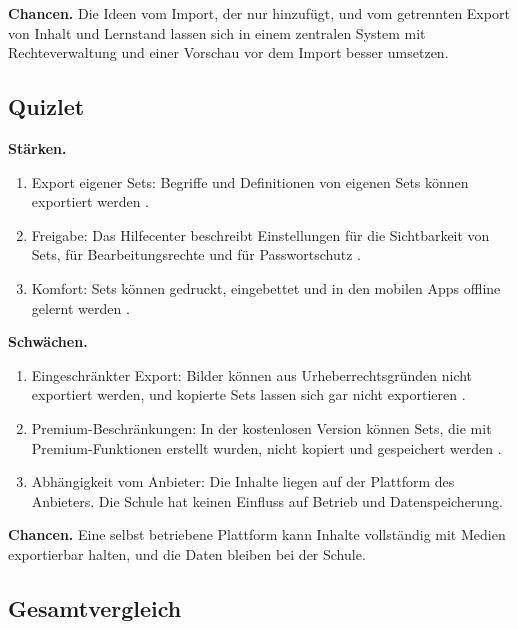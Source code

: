 \textbf{Chancen.} Die Ideen vom Import, der nur hinzufügt, und vom getrennten Export von Inhalt und Lernstand lassen sich in einem zentralen System mit Rechteverwaltung und einer Vorschau vor dem Import besser umsetzen.
 
\subsection{Quizlet}
 
\textbf{Stärken.}
\begin{enumerate}
  \item Export eigener Sets: Begriffe und Definitionen von eigenen Sets können exportiert werden \parencite{quizlet-exporting}.
  \item Freigabe: Das Hilfecenter beschreibt Einstellungen für die Sichtbarkeit von Sets, für Bearbeitungsrechte und für Passwortschutz \parencite{quizlet-sharing}.
  \item Komfort: Sets können gedruckt, eingebettet und in den mobilen Apps offline gelernt werden \parencite{quizlet-sharing}.
\end{enumerate}
 
\textbf{Schwächen.}
\begin{enumerate}
  \item Eingeschränkter Export: Bilder können aus Urheberrechtsgründen nicht exportiert werden, und kopierte Sets lassen sich gar nicht exportieren \parencite{quizlet-exporting}.
  \item Premium-Beschränkungen: In der kostenlosen Version können Sets, die mit Premium-Funktionen erstellt wurden, nicht kopiert und gespeichert werden \parencite{quizlet-copying}.
  \item Abhängigkeit vom Anbieter: Die Inhalte liegen auf der Plattform des Anbieters. Die Schule hat keinen Einfluss auf Betrieb und Datenspeicherung.
\end{enumerate}
 
\textbf{Chancen.} Eine selbst betriebene Plattform kann Inhalte vollständig mit Medien exportierbar halten, und die Daten bleiben bei der Schule.
 
\subsection{Gesamtvergleich}
 
